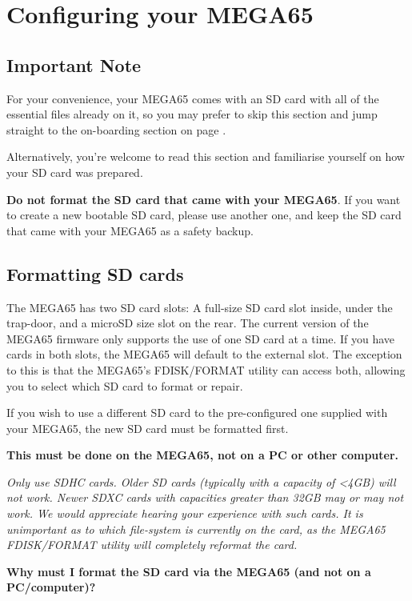 \chapter{Configuring your MEGA65}
\label{cha:configuringyourmega}

\section{Important Note}

For your convenience, your MEGA65 comes with an SD card with all of the essential
files already on it, so you may prefer to skip this section and jump straight to
the on-boarding section on page \pageref{onboarding}.

Alternatively, you're welcome to read this section and familiarise
yourself on how your SD card was prepared.

{\bf Do not format the SD card that came with your MEGA65}.
If you want to create a new bootable SD card, please use another one,
and keep the SD card that came with your MEGA65 as a safety backup.

\section{Formatting SD cards}
The MEGA65 has two SD card slots: A full-size SD card slot inside, under
the trap-door, and a microSD size slot on the rear.  The current version
of the MEGA65 firmware only supports the use of one SD card at a time.
If you have cards in both slots, the MEGA65 will default to the external slot. The exception to this is that the MEGA65's FDISK/FORMAT
utility can access both, allowing you to select which SD card to format or
repair.

If you wish to use a different SD card to the pre-configured one supplied with your MEGA65, the new SD card must be formatted first.

{\bf This must be done on the MEGA65, not on a PC or other computer.}

{\em Only use SDHC cards. Older SD cards (typically with
  a capacity of <4GB) will not work. Newer SDXC cards with
  capacities greater than 32GB may or may not work. We would
  appreciate hearing your experience with such cards. It is unimportant
  as to which file-system is currently on the card, as the MEGA65
  FDISK/FORMAT utility will completely reformat the card.}

{\bf Why must I format the SD card via the MEGA65 (and not on a PC/computer)?}

